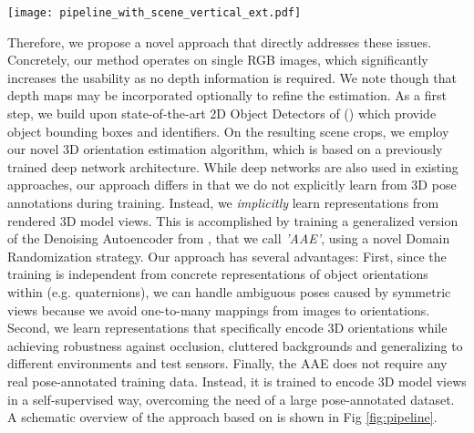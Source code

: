 \begin{figure*}[t]\centering
	\captionsetup{width=\textwidth}
	\texttt{[image: pipeline\_with\_scene\_vertical\_ext.pdf]}
\caption{Our full 6D Object Detection pipeline: after detecting an object (2D Object Detector), the object is quadratically cropped and forwarded into the proposed Augmented Autoencoder. In the next step, the bounding box scale ratio at the estimated 3D orientation  is used to compute the 3D translation . The resulting euclidean transformation  already shows promising results as presented in \cite{sundermeyer2018implicit}, however it still lacks of accuracy given a translation in the image plane towards the borders. Therefore, the pipeline is extended by the Perspective Correction block which addresses this problem and results in more accurate 6D pose estimates  for objects which are not located in the image center. Additionally, given depth data, the result can be further refined () by applying an Iterative Closest Point post-processing (bottom).}	\label{fig:pipeline}
\end{figure*}

Therefore, we propose a novel approach that directly
addresses these issues. Concretely, our method operates on single
RGB images, which significantly increases the usability as no depth
information is required. We note though that depth maps may be
incorporated optionally to refine the estimation. As a first
step, we build upon state-of-the-art 2D Object Detectors of (\cite{liu2016ssd,lin2018focal}) which provide object bounding boxes and identifiers. On the resulting scene crops, we
employ our novel 3D orientation estimation algorithm, which is based on a
previously trained deep network architecture. While deep networks are
also used in existing approaches, our approach differs in that we do
not explicitly learn from 3D pose annotations during training. Instead, we
\emph{implicitly} learn representations from rendered 3D model views. This is accomplished by training a generalized version of the Denoising Autoencoder from \cite{vincent2010stacked}, that we call \textit{'\gls{AAE}'}, using a novel Domain Randomization strategy. 
Our approach has several
advantages: First, since the training is independent from concrete representations of object orientations within  (e.g. 
quaternions), we can handle ambiguous poses caused by symmetric views because we avoid one-to-many mappings from images to orientations. Second, we learn representations that specifically encode 3D orientations while achieving
robustness against occlusion, cluttered backgrounds and generalizing to different environments and test sensors. Finally, the \gls{AAE} does not require any real pose-annotated training data. Instead, it is trained to encode 3D model views in a self-supervised way, overcoming the need of a large pose-annotated dataset. A schematic overview of the approach based on \cite{sundermeyer2018implicit} is shown in Fig \ref{fig:pipeline}.

